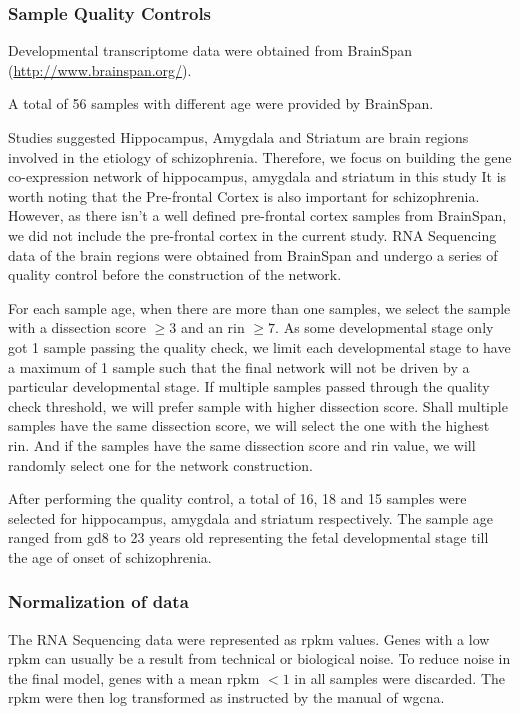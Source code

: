 \subsubsection{Sample Quality Controls}
Developmental transcriptome data were obtained from BrainSpan (\url{http://www.brainspan.org/}).

A total of 56 samples with different age were provided by BrainSpan.

Studies suggested Hippocampus\citep{Velakoulis2006,Nugent2007}, Amygdala and Striatum\citep{Simpson2010} are brain regions involved in the etiology of schizophrenia. 
Therefore, we focus on building the gene co-expression network of hippocampus, amygdala and striatum in this study
It is worth noting that the Pre-frontal Cortex is also important for schizophrenia. 
However, as there isn't a well defined pre-frontal cortex samples from BrainSpan, we did not include the pre-frontal cortex in the current study.
RNA Sequencing data of the brain regions were obtained from BrainSpan and undergo a series of quality control before the construction of the network. 

For each sample age, when there are more than one samples, we select the sample with a dissection score $\ge3$ and an \gls{rin} $\ge7$. 
As some developmental stage only got 1 sample passing the quality check, we limit each developmental stage to have a maximum of 1 sample such that the final network will not be driven by a particular developmental stage. 
If multiple samples passed through the quality check threshold, we will prefer sample with higher dissection score. 
Shall multiple samples have the same dissection score, we will select the one with the highest \gls{rin}. 
And if the samples have the same dissection score and \gls{rin} value, we will randomly select one for the network construction.

After performing the quality control, a total of 16, 18 and 15 samples were selected for hippocampus, amygdala and striatum respectively.
The sample age ranged from \gls{gd}8 to 23 years old representing the fetal developmental stage till the age of onset of schizophrenia.

\subsubsection{Normalization of data}
The RNA Sequencing data were represented as \gls{rpkm} values. 
Genes with a low \gls{rpkm} can usually be a result from technical or biological noise\citep{Hart2013}.
To reduce noise in the final model, genes with a mean \gls{rpkm} $< 1$ in all samples were discarded. 
The \gls{rpkm} were then log transformed as instructed by the manual of \gls{wgcna}\citep{Langfelder2008}.

